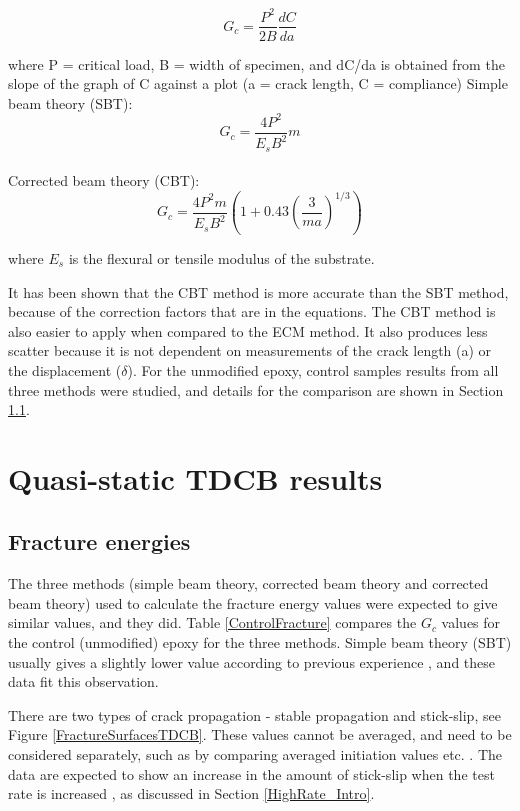 \documentclass[numbers=noendperiod,chapterprefix=on]{icldt} %
\begin{document}
\begin{equation} 
G_c=\frac{P^{2}}{2B}\frac{dC}{da} 
\end{equation}

where P = critical load, B = width of specimen, and dC/da is obtained from the slope of the graph of C against a plot (a = crack length, C = compliance)
\newline
Simple beam theory (SBT):
\begin{equation} 
G_c=\frac{4P^2}{E_{s}B^2}m
\end{equation}
\\
Corrected beam theory (CBT):
\begin{equation} 
G_c=\frac{4P^2 m}{E_s B^2}\left( 1+0.43\left( \frac{3}{ma}\right) ^{1/3} \right) 
\end{equation}

where $ E_s $ is the flexural or tensile modulus of the substrate.

It has been shown that the CBT method is more accurate than the SBT method, because of the correction factors that are in the equations. The CBT method is also easier to apply when compared to the ECM method. It also produces less scatter because it is not dependent on measurements of the crack length (a) or the displacement ($ \delta $).
For the unmodified epoxy, control samples results from all three methods were studied, and details for the comparison are shown in Section \ref{Fracture energies}.

\section{Quasi-static TDCB results}

\subsection{Fracture energies} \label{Fracture energies}
The three methods (simple beam theory, corrected beam theory and corrected beam theory) used to calculate the fracture energy values were expected to give similar values, and they did. Table \ref{ControlFracture} compares the $G_c$ values for the control (unmodified) epoxy for the three methods. Simple beam theory (SBT) usually gives a slightly lower value according to previous experience \cite{Kinloch1990}, and these data fit this observation. 

There are two types of crack propagation - stable propagation and stick-slip, see Figure \ref{FractureSurfacesTDCB}. These values cannot be averaged, and need to be considered separately, such as by comparing averaged initiation values etc. \cite{Kinloch1990}. The data are expected to show an increase in the amount of stick-slip when the test rate is increased \cite{Huang1992}, as discussed in Section \ref{HighRate_Intro}. 
\end{document}

